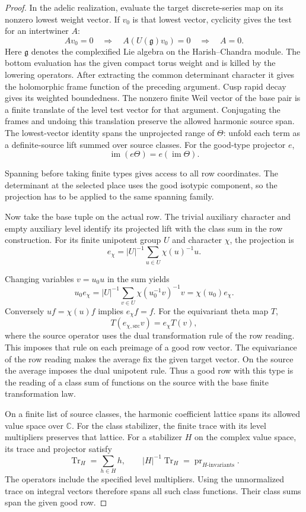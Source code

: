 \begin{proof}
In the adelic realization, evaluate the target
discrete-series map on its nonzero lowest weight
vector. If \(v_0\) is that lowest vector, cyclicity gives the test for an intertwiner \(A\):
\[
 Av_0=0\quad\Longrightarrow\quad A(U(\mathfrak g)v_0)=0\quad\Longrightarrow\quad A=0.
\]
Here \(\mathfrak g\) denotes the complexified Lie algebra on the Harish--Chandra module.
The bottom evaluation has the given compact
torus weight and is killed by the lowering
operators. After extracting the common
determinant character it gives the holomorphic
frame function of the preceding argument. Cusp
rapid decay gives its weighted boundedness. The
nonzero finite Weil vector of the base pair is
a finite translate of the level test vector for
that argument. Conjugating the frames and
undoing this translation preserve the allowed
harmonic source span. The lowest-vector identity spans the unprojected range of \(\Theta\): unfold each term as a definite-source lift summed over source classes. For the good-type projector \(e\),
\[
 \operatorname{im}(e\Theta)=e(\operatorname{im}\Theta).
\]

Spanning before taking finite types gives access to all row coordinates. The determinant at the selected place uses the good isotypic component, so the projection has to be applied to the same spanning family.

Now take the base tuple on the actual row. The
trivial auxiliary character and empty auxiliary
level identify its projected lift with the class
sum in the row construction. For its finite unipotent group \(U\) and character \(\chi\),
the projection is
\[
 e_\chi=|U|^{-1}\sum_{u\in U}\chi(u)^{-1}u.
\]

Changing variables \(v=u_0u\) in the sum yields
\[
 u_0e_\chi=|U|^{-1}\sum_{v\in U}\chi(u_0^{-1}v)^{-1}v
            =\chi(u_0)e_\chi .
\]
Conversely \(uf=\chi(u)f\) implies \(e_\chi f=f\). For the equivariant theta map \(T\),
\[
                  T(e_{\chi,\mathrm{src}}v)
                         = e_\chi T(v),
\]
where the source operator uses the dual transformation
rule of the row reading. This imposes that rule on each
preimage of a good row vector. The equivariance of the row reading
makes the average fix the given target vector.
On the source the average imposes the dual
unipotent rule. Thus a good row with this type
is the reading of a class sum of functions on
the source with the base finite transformation
law.

On a finite list of source classes, the
harmonic coefficient lattice spans its allowed
value space over \(\mathbb C\). For the class
stabilizer, the finite trace with its level
multipliers preserves that lattice. For a stabilizer \(H\) on the complex value space, its trace and projector satisfy
\[
 \operatorname{Tr}_H=\sum_{h\in H}h,\qquad |H|^{-1}\operatorname{Tr}_H=\operatorname{pr}_{H\text{-invariants}}.
\]
The operators include the specified level multipliers. Using the unnormalized trace on
integral vectors therefore spans all such class
functions. Their class sums span the given good
row.


\end{proof}
